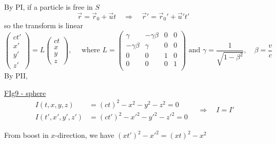 \documentclass[12pt]{article}
\begin{document}
By PI, if a particle is free in $S$
\begin{equation}
\vec{r} = \vec{r}_0 + \vec{u} t \quad\Rightarrow\quad \vec{r}' = \vec{r}_0' + \vec{u}' t'
\end{equation}
so the transform is linear
\begin{equation}
\begin{pmatrix}
ct'\\ x'\\ y'\\ z'
\end{pmatrix}
= L \begin{pmatrix}
ct\\ x\\ y\\ z
\end{pmatrix},
\quad\text{ where } L =
\begin{pmatrix}
\gamma & -\gamma\beta & 0 & 0\\
-\gamma\beta & \gamma & 0 & 0\\
0 & 0 & 1 & 0\\
0 & 0 & 0 & 1\\
\end{pmatrix} \text{ and }
\gamma = \frac{1}{\sqrt{1-\beta^2}}, \quad \beta = \frac{v}{c}
\end{equation}
By PII, 

\underline{FIg9 - sphere}
\begin{equation}
\begin{aligned}
I(t,x,y,z) &= (ct)^2 - x^2 - y^2 - z^2 = 0\\
I(t',x',y',z') &= (ct')^2 - x'^2 - y'^2 - z'^2 = 0
\end{aligned}\quad\Rightarrow\quad I = I'
\end{equation}



From boost in $x$-direction, we have $(xt')^2 - x'^2 = (xt)^2 - x^2$
\end{document}
